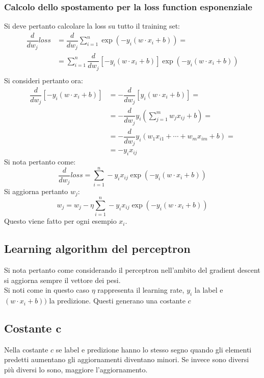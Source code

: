 		\subsubsection{Calcolo dello spostamento per la loss function esponenziale}
		Si deve pertanto calcolare la loss su tutto il training set:
		\begin{align*}
			\dfrac{d}{dw_j}loss &=\dfrac{d}{dw_j}\sum\limits_{i=1}^n\exp(-y_i(w\cdot x_i + b))=\\
												 &=\sum\limits_{i=1}^n\dfrac{d}{dw_j}[-y_i(w\cdot x_i+b)]\exp(-y_i(w\cdot x_i+b))\\
		\end{align*}
		Si consideri pertanto ora:
		\begin{align*}
			\dfrac{d}{dw_j}[-y_i(w\cdot x_i + b)]&=-\dfrac{d}{dw_j}[y_i(w\cdot x_i + b)]=\\
																		&=-\dfrac{d}{dw_j}y_i(\sum_{j=1}^{m}w_jx_{ij}+b)=\\
																		&=-\dfrac{d}{dw_j}y_i(w_1x_{i1}+\cdots+w_mx_{im}+b)=\\
																		&=-y_ix_{ij}
		\end{align*}
		Si nota pertanto come:
		$$\dfrac{d}{dw_j}loss=\sum\limits_{i=1}^n-y_ix_{ij}\exp(-y_i(w\cdot x_i+b))$$
		Si aggiorna pertanto $w_j$:
		$$w_j=w_j-\eta\sum\limits_{i=1}^n-y_ix_{ij}\exp(-y_i(w\cdot x_i+b))$$
		Questo viene fatto per ogni esempio $x_i$.

	\subsection{Learning algorithm del perceptron}
	Si nota pertanto come considerando il perceptron nell'ambito del gradient descent si aggiorna sempre il vettore dei pesi.\\
	
	Si noti come in questo caso $\eta$ rappresenta il learning rate, $y_i$ la label e $(w\cdot x_i + b))$ la predizione.
	Questi generano una costante $c$

	\subsection{Costante $\mathbf{c}$}
	Nella costante $c$ se label e predizione hanno lo stesso segno quando gli elementi predetti aumentano gli aggiornamenti diventano minori.
	Se invece sono diversi pi\`u diversi lo sono, maggiore l'aggiornamento.

